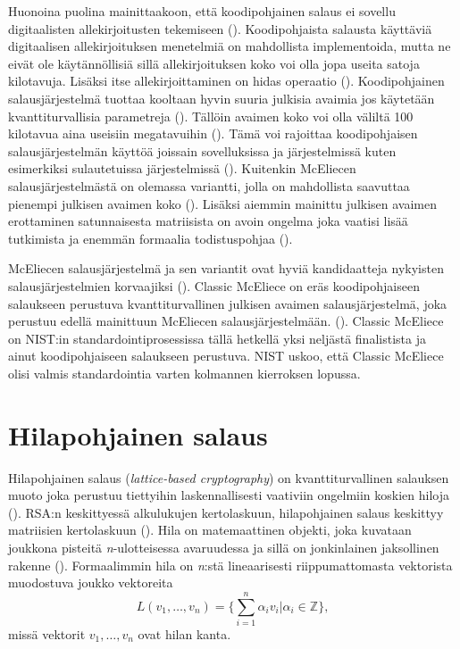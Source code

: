 Huonoina puolina mainittaakoon, että koodipohjainen salaus ei sovellu digitaalisten allekirjoitusten tekemiseen (\cite{8012331}). Koodipohjaista salausta käyttäviä digitaalisen allekirjoituksen menetelmiä on mahdollista implementoida, mutta ne eivät ole käytännöllisiä sillä allekirjoituksen koko voi olla jopa useita satoja kilotavuja. Lisäksi itse allekirjoittaminen on hidas operaatio (\cite{buchmann2016post}). Koodipohjainen salausjärjestelmä tuottaa kooltaan hyvin suuria julkisia avaimia jos käytetään kvanttiturvallisia parametreja (\cite{8012331}). Tällöin avaimen koko voi olla väliltä 100 kilotavua aina useisiin megatavuihin (\cite{mavroeidis2018impact}). Tämä voi rajoittaa koodipohjaisen salausjärjestelmän käyttöä joissain sovelluksissa ja järjestelmissä kuten esimerkiksi sulautetuissa järjestelmissä (\cite{repka2014overview}). Kuitenkin McEliecen salausjärjestelmästä on olemassa variantti, jolla on mahdollista saavuttaa pienempi julkisen avaimen koko (\cite{buchmann2016post}). Lisäksi aiemmin mainittu julkisen avaimen erottaminen satunnaisesta matriisista on avoin ongelma joka vaatisi lisää tutkimista ja enemmän formaalia todistuspohjaa (\cite{8012331}).

McEliecen salausjärjestelmä ja sen variantit ovat hyviä kandidaatteja nykyisten salausjärjestelmien korvaajiksi (\cite{8012331}). Classic McEliece on eräs koodipohjaiseen salaukseen perustuva kvanttiturvallinen julkisen avaimen salausjärjestelmä, joka perustuu edellä mainittuun McEliecen salausjärjestelmään. (\cite{alagic2020status}). Classic McEliece on NIST:in standardointiprosessissa tällä hetkellä yksi neljästä finalistista ja ainut koodipohjaiseen salaukseen perustuva. NIST uskoo, että Classic McEliece olisi valmis standardointia varten kolmannen kierroksen lopussa.

\section{Hilapohjainen salaus}
Hilapohjainen salaus (\emph{lattice-based cryptography}) on kvanttiturvallinen salauksen muoto joka perustuu tiettyihin laskennallisesti vaativiin ongelmiin koskien hiloja (\cite{regev2006lattice}). RSA:n keskittyessä alkulukujen kertolaskuun, hilapohjainen salaus keskittyy matriisien kertolaskuun (\cite{mavroeidis2018impact}). Hila on matemaattinen objekti, joka kuvataan joukkona pisteitä \emph{n}-ulotteisessa avaruudessa ja sillä on jonkinlainen jaksollinen rakenne (\cite{regev2006lattice}). Formaalimmin hila on \emph{n}:stä lineaarisesti riippumattomasta vektorista muodostuva joukko vektoreita 
\[L(v_1, \ldots ,v_n) =\Bigg\{ {\sum_{i=1}^{n}\alpha_i 
v_i|\alpha_i \in \mathbb{Z}} \Bigg\},\]
missä vektorit $v_1, \ldots ,v_n$ ovat hilan kanta.

